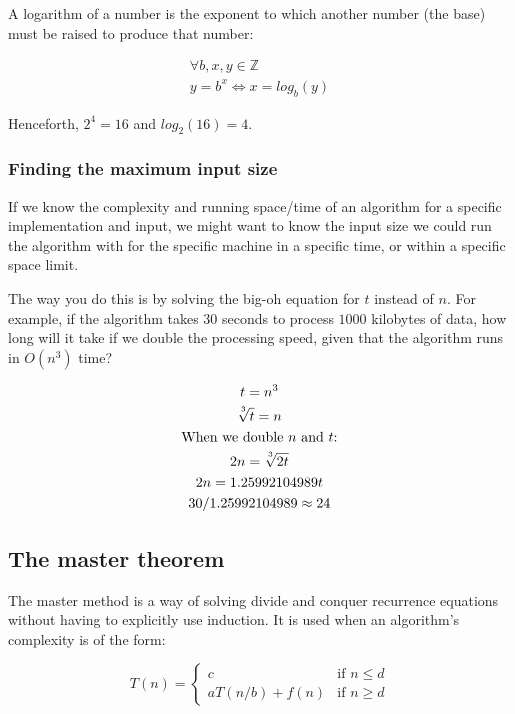 A logarithm of a number is the exponent to which another number (the base) must
be raised to produce that number:

\begin{gather*}
  \forall b,x,y \in \mathbb{Z}\\
  y = b^x \Leftrightarrow x = log_b(y)
\end{gather*}

Henceforth, $2^4 = 16$ and $log_2(16) = 4$.

\subsubsection{Finding the maximum input size}

If we know the complexity and running space/time of an algorithm for a specific
implementation and input, we might want to know the input size we could run the
algorithm with for the specific machine in a specific time, or within a specific
space limit.

The way you do this is by solving the big-oh equation for $t$ instead of $n$.
For example, if the algorithm takes $30$ seconds to process $1000$ kilobytes of
data, how long will it take if we double the processing speed, given that the
algorithm runs in $O(n^3)$ time?


\begin{gather*}
  t = n^3\\
  \sqrt[\leftroot{-0}\uproot{3}3]{t} = n\\
  \text{When we double $n$ and $t$:}\\
  2n = \sqrt[\leftroot{-0}\uproot{3}3]{2t}\\
  2n = 1.25992104989t\\
  30 / 1.25992104989 \approx 24\\
\end{gather*}

\subsection{The master theorem}


The master method is a way of solving divide and conquer recurrence equations
without having to explicitly use induction. It is used when an algorithm's
complexity is of the form:

\[
  T(n) = 
  \begin{cases}
    c               & \text{if $n \le d$}\\
    aT(n/b) + f(n)  & \text{if $n \geq d$}
  \end{cases}
\]

